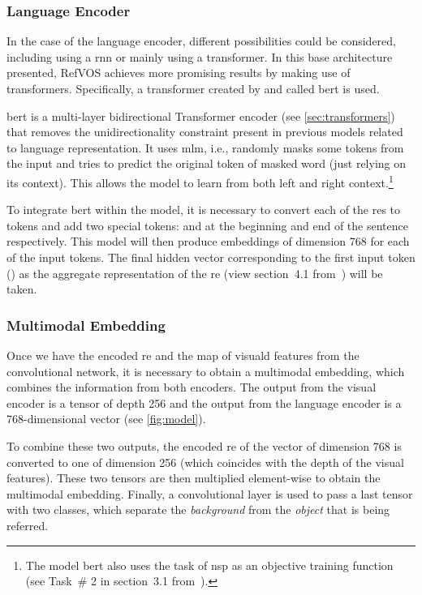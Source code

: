 \subsubsection{Language Encoder}

In the case of the language encoder, different possibilities could be
considered, including using a \gls{rnn} or mainly using a transformer. In this
base architecture presented, RefVOS achieves more promising results by making
use of transformers. Specifically, a transformer created by
 and called \gls{bert} is used.

\gls{bert} is a multi-layer bidirectional Transformer encoder (see
\vref{sec:transformers}) that removes the unidirectionality constraint present
in previous models related to language representation. It uses \gls{mlm}, i.e.,
randomly masks some tokens from the input and tries to predict the original
token of masked word (just relying on its context). This allows the model to
learn from both left and right context.\footnote{The model \gls{bert} also uses
  the task of \gls{nsp} as an objective training function (see Task~\# 2 in
  section~3.1 from~\cite{devlin19:bert}).}

To integrate \gls{bert} within the model, it is necessary to convert each of
the \glspl{re} to tokens and add two special tokens: \code{[CLS]} and
\code{[SEP]} at the beginning and end of the sentence respectively. This model
will then produce embeddings of dimension 768 for each of the input tokens. The
final hidden vector corresponding to the first input token (\code{[CLS]}) as
the aggregate representation of the \gls{re} (view section~4.1
from~\cite{devlin19:bert}) will be taken.

\subsubsection{Multimodal Embedding}

Once we have the encoded \gls{re} and the map of visuald features from the
convolutional network, it is necessary to obtain a multimodal embedding, which
combines the information from both encoders. The output from the visual encoder
is a tensor of depth 256 and the output from the language encoder is a
768-dimensional vector (see \vref{fig:model}).

To combine these two outputs, the encoded \gls{re} of the vector of dimension
768 is converted to one of dimension 256 (which coincides with the depth of the
visual features). These two tensors are then multiplied element-wise to obtain
the multimodal embedding. Finally, a convolutional layer is used to pass a last
tensor with two classes, which separate the \emph{background} from the
\emph{object} that is being referred.


